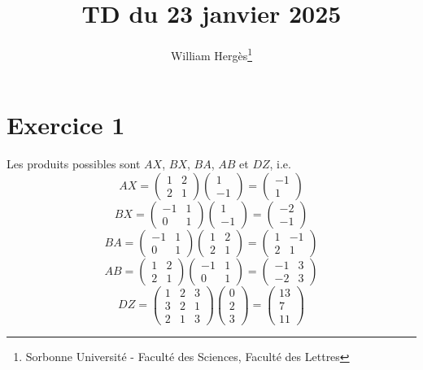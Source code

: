 \documentclass[a4paper, titlepage]{article}
\title{TD du 23 janvier 2025}
\author{William Hergès\thanks{Sorbonne Université - Faculté des Sciences, Faculté des Lettres}}
\begin{document}
	\maketitle
	\newpage
	\section*{Exercice 1}
	Les produits possibles sont $AX$, $BX$, $BA$, $AB$ et $DZ$, i.e.
	$$ AX = \begin{pmatrix} 1&2\\ 2&1 \end{pmatrix}\begin{pmatrix} 1\\-1 \end{pmatrix} = \begin{pmatrix} -1\\1 \end{pmatrix} $$
	$$ BX = \begin{pmatrix} -1&1\\0&1 \end{pmatrix}\begin{pmatrix} 1\\-1 \end{pmatrix} = \begin{pmatrix} -2\\-1 \end{pmatrix} $$
	$$ BA = \begin{pmatrix} -1&1\\0&1 \end{pmatrix}\begin{pmatrix} 1&2\\2&1 \end{pmatrix}= \begin{pmatrix} 1&-1\\2&1 \end{pmatrix} $$
	$$ AB =  \begin{pmatrix} 1&2\\2&1 \end{pmatrix}\begin{pmatrix} -1&1\\0&1 \end{pmatrix} = \begin{pmatrix} -1&3\\-2&3  \end{pmatrix} $$ 
	$$ DZ = \begin{pmatrix} 1&2&3\\3&2&1\\2&1&3 \end{pmatrix} \begin{pmatrix} 0\\2\\3 \end{pmatrix} = \begin{pmatrix} 13\\7\\11  \end{pmatrix}  $$
\end{document}
